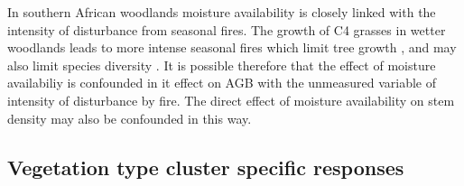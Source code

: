 \documentclass[11pt,a4paper]{article}
\begin{document}
In southern African woodlands moisture availability is closely linked with the intensity of disturbance from seasonal fires. The growth of C4 grasses in wetter woodlands leads to more intense seasonal fires which limit tree growth \citep{Charles-Dominique2018}, and may also limit species diversity \citep{Linder2014}. It is possible therefore that the effect of moisture availabiliy is confounded in it effect on AGB with the unmeasured variable of intensity of disturbance by fire. The direct effect of moisture availability on stem density may also be confounded in this way.


\subsection{Vegetation type cluster specific responses}


\end{document}
